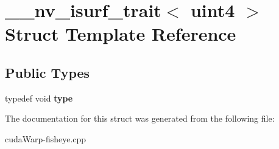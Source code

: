 \hypertarget{struct____nv__isurf__trait_3_01uint4_01_4}{}\section{\+\_\+\+\_\+nv\+\_\+isurf\+\_\+trait$<$ uint4 $>$ Struct Template Reference}
\label{struct____nv__isurf__trait_3_01uint4_01_4}
\subsection*{Public Types}
\begin{DoxyCompactItemize}
\item 
typedef void {\bfseries type}\hypertarget{struct____nv__isurf__trait_3_01uint4_01_4_a2ed6601b46d97bc1116e05241c7452e9}{}\label{struct____nv__isurf__trait_3_01uint4_01_4_a2ed6601b46d97bc1116e05241c7452e9}

\end{DoxyCompactItemize}


The documentation for this struct was generated from the following file\+:\begin{DoxyCompactItemize}
\item 
cuda\+Warp-\/fisheye.\+cpp\end{DoxyCompactItemize}
